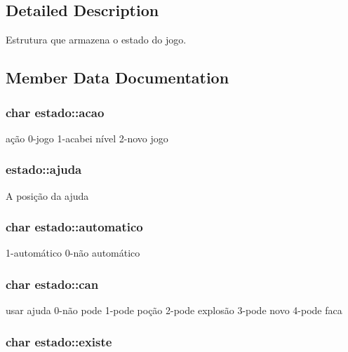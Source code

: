 \subsection{Detailed Description}
Estrutura que armazena o estado do jogo. 

\subsection{Member Data Documentation}
\hypertarget{structestado_ae8ee3c5f52f5342c47dcaad66e31bc58}{
\subsubsection[{acao}]{\setlength{\rightskip}{0pt plus 5cm}char estado\+::acao}}\label{structestado_ae8ee3c5f52f5342c47dcaad66e31bc58}
ação 0-\/jogo 1-\/acabei nível 2-\/novo jogo \hypertarget{structestado_a426cd99284bc16bd15156a80ff72529c}{
\subsubsection[{ajuda}]{ estado\+::ajuda}}\label{structestado_a426cd99284bc16bd15156a80ff72529c}
A posição da ajuda \hypertarget{structestado_a4d74973997bfe99d6d99b1f5ffeab68e}{
\subsubsection[{automatico}]{\setlength{\rightskip}{0pt plus 5cm}char estado\+::automatico}}\label{structestado_a4d74973997bfe99d6d99b1f5ffeab68e}
1-\/automático 0-\/não automático \hypertarget{structestado_ab1ce35a6c6d241c38b19f8f3d56484e4}{
\subsubsection[{can}]{\setlength{\rightskip}{0pt plus 5cm}char estado\+::can}}\label{structestado_ab1ce35a6c6d241c38b19f8f3d56484e4}
usar ajuda 0-\/não pode 1-\/pode poção 2-\/pode explosão 3-\/pode novo 4-\/pode faca \hypertarget{structestado_a36d0b93f42177acd9271d9d088814a8b}{
\subsubsection[{existe}]{\setlength{\rightskip}{0pt plus 5cm}char estado\+::existe}}\label{structestado_a36d0b93f42177acd9271d9d088814a8b}
